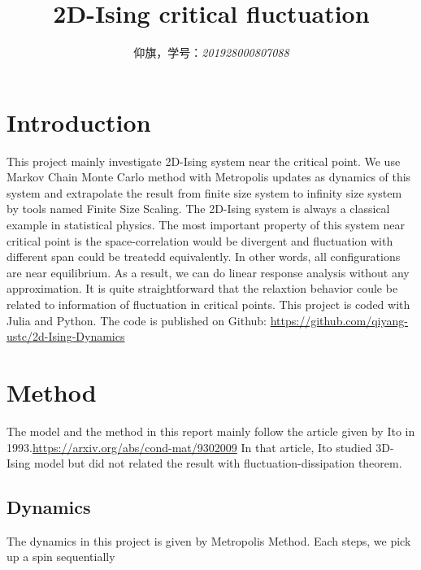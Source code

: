 \documentclass[a4paper]{article}
\begin{document}
\setlength{\leftskip}{20pt}

\title{2D-Ising critical fluctuation}
\author{仰旗，学号：{\it 201928000807088}}

 \maketitle

\section{Introduction}
This project mainly investigate 2D-Ising system near the critical point. We use Markov Chain Monte Carlo method
with Metropolis updates as dynamics of this system and extrapolate the result from finite size system to infinity size
system by tools named Finite Size Scaling.
\newline
The 2D-Ising system is always a classical example in statistical physics. The most important property of this system 
near critical point is the space-correlation would be divergent and fluctuation with different span could be treatedd 
equivalently. In other words, all configurations are near equilibrium. As a result, we can do linear response analysis 
without any approximation. It is quite straightforward that the relaxtion behavior coule be related to information of 
fluctuation in critical points.
\newline
This project is coded with Julia and Python. The code is published on Github: 
\url{https://github.com/qiyang-ustc/2d-Ising-Dynamics}

\section{Method}
The model and the method in this report mainly follow the article given by Ito in 1993.\url{https://arxiv.org/abs/cond-mat/9302009}
In that article, Ito studied 3D-Ising model but did not related the result with fluctuation-dissipation theorem.\newline
\subsection{Dynamics}
The dynamics in this project is given by Metropolis Method. Each steps, we pick up a spin sequentially
\end{document}
